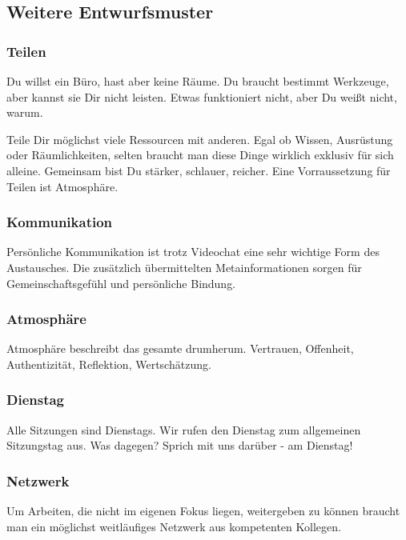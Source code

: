 {  \subsection{Weitere Entwurfsmuster}

\subsubsection{Teilen}
\begin{em}
Du willst ein Büro, hast aber keine Räume.
%
Du braucht bestimmt Werkzeuge, aber kannst sie Dir nicht leisten.
%
Etwas funktioniert nicht, aber Du weißt nicht, warum.
\end{em}



Teile Dir möglichst viele Ressourcen mit anderen.
%
Egal ob Wissen, Ausrüstung oder Räumlichkeiten, selten braucht man diese Dinge wirklich exklusiv für sich alleine.
%
Gemeinsam bist Du stärker, schlauer, reicher.
%
Eine Vorraussetzung für Teilen ist Atmosphäre.

     \subsubsection{Kommunikation}
Persönliche Kommunikation ist trotz Videochat eine sehr wichtige Form des Austausches.
%
Die zusätzlich übermittelten Metainformationen sorgen für Gemeinschaftsgefühl und persönliche Bindung.

   \subsubsection{Atmosphäre}
Atmosphäre beschreibt das gesamte drumherum.
%
Vertrauen, Offenheit, Authentizität, Reflektion, Wertschätzung.
     \subsubsection{Dienstag}
Alle Sitzungen sind Dienstags.
%
Wir rufen den Dienstag zum allgemeinen Sitzungstag aus.
%
Was dagegen? Sprich mit uns darüber - am Dienstag!

\subsubsection{Netzwerk}
\begin{em}
Um Arbeiten, die nicht im eigenen Fokus liegen, weitergeben zu können braucht man ein möglichst 
weitläufiges Netzwerk aus kompetenten Kollegen.
\end{em}



}
